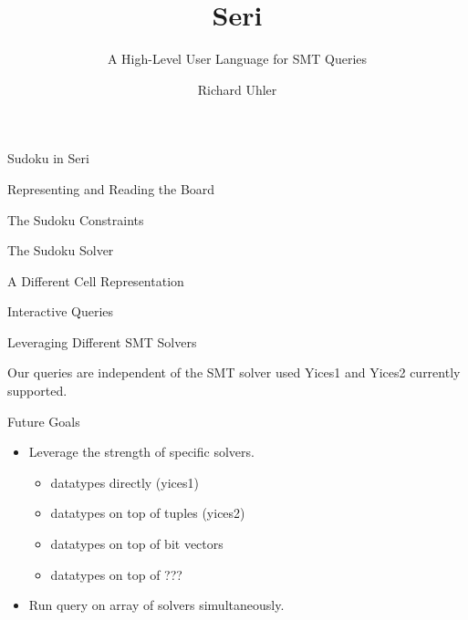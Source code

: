 \documentclass{beamer}
\title{Seri}
\subtitle{A High-Level User Language for SMT Queries}
\author{Richard Uhler}
\begin{document}
\begin{frame}
    \titlepage
\end{frame}

\begin{frame}{Sudoku in Seri}
\end{frame}
 
\begin{frame}{Representing and Reading the Board}
\end{frame}

\begin{frame}{The Sudoku Constraints}
\end{frame}

\begin{frame}{The Sudoku Solver}
\end{frame}

\begin{frame}{A Different Cell Representation}
\end{frame}

\begin{frame}{Interactive Queries}
\end{frame}

\begin{frame}{Leveraging Different SMT Solvers}
\begin{block}{Our queries are independent of the SMT solver used}
Yices1 and Yices2 currently supported.
\end{block}
\begin{block}{Future Goals}
    \begin{itemize}
        \item Leverage the strength of specific solvers.
        \begin{itemize}
            \item datatypes directly (yices1)
            \item datatypes on top of tuples (yices2)
            \item datatypes on top of bit vectors
            \item datatypes on top of ???
        \end{itemize}

        \item Run query on array of solvers simultaneously.
    \end{itemize}
\end{block}
\end{frame}
\end{document}
